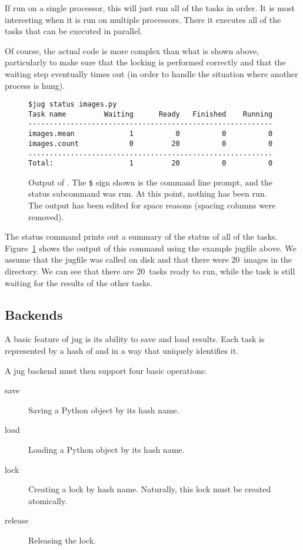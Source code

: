\documentclass{article}
\begin{document}
If run on a single processor, this will just run all of the tasks in order. It
is most interesting when it is run on multiple processors. There it executes
all of the tasks that can be executed in parallel.

Of course, the actual code is more complex than what is shown above,
particularly to make sure that the locking is performed correctly and that the
waiting step eventually times out (in order to handle the situation where
another process is hung).

\begin{figure}
\begin{verbatim}
$jug status images.py
Task name         Waiting      Ready   Finished    Running
----------------------------------------------------------
images.mean             1          0          0          0
images.count            0         20          0          0
..........................................................
Total:                  1         20          0          0
\end{verbatim}
\caption{Output of . The \texttt{\$} sign shown is the command
line prompt, and the status subcommand was run. At this point, nothing has been
run. The output has been edited for space reasons (spacing columns were
removed).}
\label{fig:jug-status-output}
\end{figure}

The status command prints out a summary of the status of all of the tasks.
Figure~\ref{fig:jug-status-output} shows the output of this command using the
example jugfile above. We assume that the jugfile was called 
on disk and that there were 20~images in the directory. We can see that there
are 20~tasks ready to run, while the  task is still waiting for the
results of the other tasks.

\subsection{Backends}

A basic feature of jug is its ability to save and load results. Each task
 is represented by a hash of  and  in a
way that uniquely identifies it.

A jug backend must then support four basic operations:

\begin{description}
\item[save] Saving a Python object by its hash name.
\item[load] Loading a Python object by its hash name.
\item[lock] Creating a lock by hash name. Naturally, this lock must be created
atomically.
\item[release] Releasing the lock.
\end{description}
\end{document}
